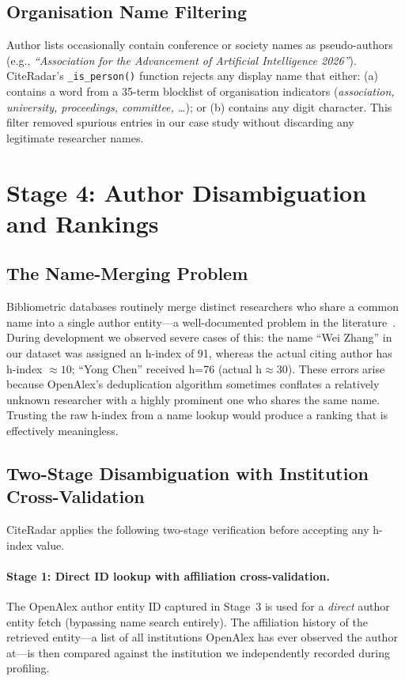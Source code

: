 \documentclass[11pt]{article}
\begin{document}
\subsection{Organisation Name Filtering}

Author lists occasionally contain conference or society names as
pseudo-authors (e.g., \textit{``Association for the Advancement of Artificial
Intelligence 2026''}).
CiteRadar's \texttt{\_is\_person()} function rejects any display name that
either: (a) contains a word from a 35-term blocklist of organisation
indicators (\textit{association, university, proceedings, committee, \ldots});
or (b) contains any digit character.
This filter removed spurious entries in our case study without discarding
any legitimate researcher names.


\section{Stage 4: Author Disambiguation and Rankings}
\label{sec:ranking}

\subsection{The Name-Merging Problem}

Bibliometric databases routinely merge distinct researchers who share a
common name into a single author entity—a well-documented problem in
the literature~\cite{ferreira2012brief,caron2014large}.
During development we observed severe cases of this: the name ``Wei Zhang''
in our dataset was assigned an h-index of 91, whereas the actual citing
author has h-index $\approx 10$; ``Yong Chen'' received h=76 (actual h$\approx$30).
These errors arise because OpenAlex's deduplication algorithm sometimes
conflates a relatively unknown researcher with a highly prominent one
who shares the same name.
Trusting the raw h-index from a name lookup would produce a ranking that
is effectively meaningless.

\subsection{Two-Stage Disambiguation with Institution Cross-Validation}

CiteRadar applies the following two-stage verification before accepting
any h-index value.

\paragraph{Stage 1: Direct ID lookup with affiliation cross-validation.}
The OpenAlex author entity ID captured in Stage~3 is used for a
\emph{direct} author entity fetch (bypassing name search entirely).
The affiliation history of the retrieved entity—a list of all institutions
OpenAlex has ever observed the author at—is then compared against the
institution we independently recorded during profiling.
\end{document}
